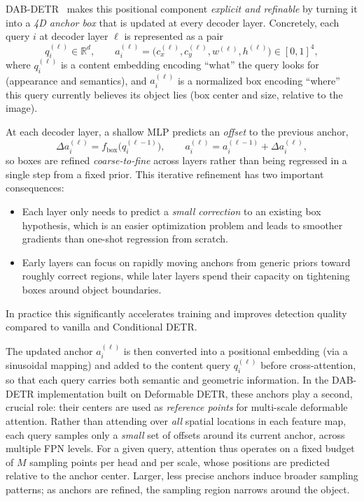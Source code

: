 \begin{enrichment}
\begin{enrichment}
		DAB-DETR~\cite{liu2022_dab_detr} makes this positional component \emph{explicit and refinable} by turning it into a \emph{4D anchor box} that is updated at every decoder layer. Concretely, each query $i$ at decoder layer $\ell$ is represented as a pair
		\[
		q_i^{(\ell)} \in \mathbb{R}^d, \qquad
		a_i^{(\ell)} = \bigl(c_x^{(\ell)}, c_y^{(\ell)}, w^{(\ell)}, h^{(\ell)}\bigr) \in [0,1]^4,
		\]
		where $q_i^{(\ell)}$ is a content embedding encoding ``what'' the query looks for (appearance and semantics), and $a_i^{(\ell)}$ is a normalized box encoding ``where'' this query currently believes its object lies (box center and size, relative to the image).
		
		At each decoder layer, a shallow MLP predicts an \emph{offset} to the previous anchor,
		\[
		\Delta a_i^{(\ell)} = f_{\text{box}}\!\bigl(q_i^{(\ell-1)}\bigr), \qquad
		a_i^{(\ell)} = a_i^{(\ell-1)} + \Delta a_i^{(\ell)},
		\]
		so boxes are refined \emph{coarse-to-fine} across layers rather than being regressed in a single step from a fixed prior. This iterative refinement has two important consequences:
		\begin{itemize}
			\item Each layer only needs to predict a \emph{small correction} to an existing box hypothesis, which is an easier optimization problem and leads to smoother gradients than one-shot regression from scratch.
			\item Early layers can focus on rapidly moving anchors from generic priors toward roughly correct regions, while later layers spend their capacity on tightening boxes around object boundaries.
		\end{itemize}
		In practice this significantly accelerates training and improves detection quality compared to vanilla and Conditional DETR.
		
		The updated anchor $a_i^{(\ell)}$ is then converted into a positional embedding (via a sinusoidal mapping) and added to the content query $q_i^{(\ell)}$ before cross-attention, so that each query carries both semantic and geometric information. In the DAB-DETR implementation built on Deformable DETR, these anchors play a second, crucial role: their centers are used as \emph{reference points} for multi-scale deformable attention. Rather than attending over \emph{all} spatial locations in each feature map, each query samples only a \emph{small} set of offsets around its current anchor, across multiple FPN levels. For a given query, attention thus operates on a fixed budget of $M$ sampling points per head and per scale, whose positions are predicted relative to the anchor center. Larger, less precise anchors induce broader sampling patterns; as anchors are refined, the sampling region narrows around the object.
		

\end{enrichment}
\end{enrichment}
